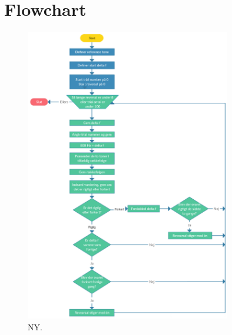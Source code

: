 \chapter{Flowchart}
\label{app:Flowchart}

\begin{figure}[H]
	\centering
	\includegraphics[resolution=300,width=0.8\textwidth]{Figure/Flowchart}
	\caption{NY.}
	\label{fig:Flowchart}
\end{figure}
\noindent
